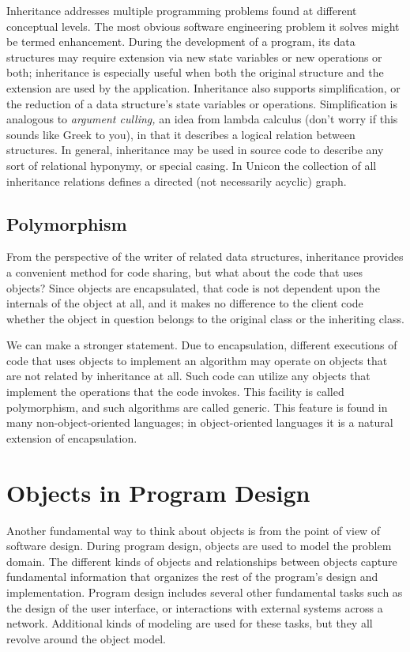 Inheritance addresses multiple programming problems found at
different conceptual levels. The most obvious software engineering
problem it solves might be termed enhancement. During the development
of a program, its data structures may require extension via new state
variables or new operations or both; inheritance is especially useful
when both the original structure and the extension are used by the
application. Inheritance also supports simplification, or the reduction
of a data structure's state variables or operations.
Simplification is analogous to \textit{argument
culling}\textit{,} an idea from lambda calculus (don't
worry if this sounds like Greek to you), in that it describes a logical
relation between structures. In general, inheritance may be used in
source code to describe any sort of relational hyponymy, or special
casing. In Unicon the collection of all inheritance relations defines a
directed (not necessarily acyclic) graph. 

\subsection{Polymorphism}

From the perspective of the writer of related data
structures, inheritance provides a convenient method for code sharing,
but what about the code that uses objects? Since objects are
encapsulated, that code is not dependent upon the internals of the
object at all, and it makes no difference to the client code whether
the object in question belongs to the original class or the inheriting
class. 

We can make a stronger statement. Due to encapsulation,
different executions of code that uses objects to implement an
algorithm may operate on objects that are not
related by inheritance at all. Such code can utilize any objects that
implement the operations that the code invokes. This facility is called
polymorphism, and such algorithms are called generic. This feature is
found in many non-object-oriented languages; in object-oriented
languages it is a natural extension of encapsulation. 

\section{Objects in Program Design}

Another fundamental way to think about objects is
from the point of view of software design. During program design,
objects are used to model the problem domain. The different kinds of
objects and relationships between objects capture fundamental
information that organizes the rest of the program's
design and implementation. Program design includes several other
fundamental tasks such as the design of the user interface, or
interactions with external systems across a network. Additional kinds
of modeling are used for these tasks, but they all revolve around the
object model.

